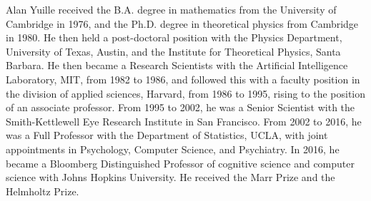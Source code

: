 \documentclass[10pt,journal,compsoc]{IEEEtran}
\begin{document}
\begin{IEEEbiography}{Alan Yuille}
received the B.A. degree in mathematics from the University of Cambridge in 1976,
and the Ph.D. degree in theoretical physics from Cambridge in 1980.
He then held a post-doctoral position with the Physics Department, University of Texas, Austin,
and the Institute for Theoretical Physics, Santa Barbara.
He then became a Research Scientists with the Artificial Intelligence Laboratory, MIT, from 1982 to 1986,
and followed this with a faculty position in the division of applied sciences, Harvard,
from 1986 to 1995, rising to the position of an associate professor.
From 1995 to 2002, he was a Senior Scientist with the Smith-Kettlewell Eye Research Institute in San Francisco.
From 2002 to 2016, he was a Full Professor with the Department of Statistics, UCLA, with joint appointments in Psychology, Computer Science, and Psychiatry.
In 2016, he became a Bloomberg Distinguished Professor of cognitive science and computer science with Johns Hopkins University.
He received the Marr Prize and the Helmholtz Prize.
\end{IEEEbiography}

% 










\end{document}
